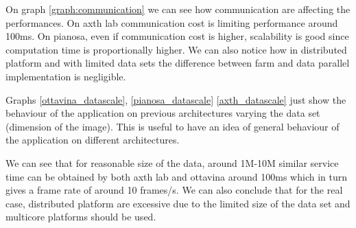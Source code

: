 On graph \ref{graph:communication} we can see how communication are affecting the performances.
On axth lab communication cost is limiting performance around 100ms.
On pianosa, even if communication cost is higher, scalability is good since computation time is proportionally higher.
We can also notice how in distributed platform and with limited data sets the difference between farm and data parallel implementation is negligible.

Graphs \ref{ottavina_datascale}, \ref{pianosa_datascale} \ref{axth_datascale} just show the behaviour of the application on previous architectures varying the data set (dimension of the image). 
This is useful to have an idea of general behaviour of the application on different architectures.

We can see that for reasonable size of the data, around 1M-10M similar service time can be obtained by both axth lab and ottavina around 100ms which in turn gives a frame rate of around 10 frames/s.
We can also conclude that for the real case, distributed platform are excessive due to the limited size of the data set and multicore platforms should be used.